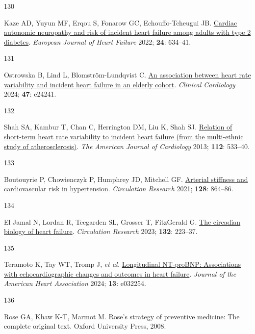 \documentclass[
  a4paper,
  headsepline=true,
  open=left]{scrbook}
\newlength{\cslhangindent}
\newlength{\csllabelwidth}
\newlength{\cslentryspacingunit} %
\newenvironment{CSLReferences}[2] %
 {%
  \setlength{\parindent}{0pt}
  \ifodd #1
  \let\oldpar\par
  \def\par{\hangindent=\cslhangindent\oldpar}
  \fi
  \setlength{\parskip}{#2\cslentryspacingunit}
 }%
 {}
\newcommand{\CSLLeftMargin}[1]{\parbox[t]{\csllabelwidth}{#1}}
\newcommand{\CSLRightInline}[1]{\parbox[t]{\linewidth - \csllabelwidth}{#1}\break}
\begin{document}
\begin{CSLReferences}{0}{0}
\leavevmode{}%
\CSLLeftMargin{130 }%
\CSLRightInline{Kaze AD, Yuyun MF, Erqou S, Fonarow GC,
Echouffo-Tcheugui JB. \href{https://doi.org/10.1002/ejhf.2432}{Cardiac
autonomic neuropathy and risk of incident heart failure among adults
with type 2 diabetes}. \emph{European Journal of Heart Failure} 2022;
\textbf{24}: 634--41.}

\leavevmode{}%
\CSLLeftMargin{131 }%
\CSLRightInline{Ostrowska B, Lind L, Blomström-Lundqvist C.
\href{https://doi.org/10.1002/clc.24241}{An association between heart
rate variability and incident heart failure in an elderly cohort}.
\emph{Clinical Cardiology} 2024; \textbf{47}: e24241.}

\leavevmode{}%
\CSLLeftMargin{132 }%
\CSLRightInline{Shah SA, Kambur T, Chan C, Herrington DM, Liu K, Shah
SJ. \href{https://doi.org/10.1016/j.amjcard.2013.04.018}{Relation of
short-term heart rate variability to incident heart failure (from the
multi-ethnic study of atherosclerosis)}. \emph{The American Journal of
Cardiology} 2013; \textbf{112}: 533--40.}

\leavevmode{}%
\CSLLeftMargin{133 }%
\CSLRightInline{Boutouyrie P, Chowienczyk P, Humphrey JD, Mitchell GF.
\href{https://doi.org/10.1161/CIRCRESAHA.121.318061}{Arterial stiffness
and cardiovascular risk in hypertension}. \emph{Circulation Research}
2021; \textbf{128}: 864--86.}

\leavevmode{}%
\CSLLeftMargin{134 }%
\CSLRightInline{El Jamal N, Lordan R, Teegarden SL, Grosser T,
FitzGerald G. \href{https://doi.org/10.1161/CIRCRESAHA.122.321369}{The
circadian biology of heart failure}. \emph{Circulation Research} 2023;
\textbf{132}: 223--37.}

\leavevmode{}%
\CSLLeftMargin{135 }%
\CSLRightInline{Teramoto K, Tay WT, Tromp J, \emph{et al.}
\href{https://doi.org/10.1161/JAHA.123.032254}{Longitudinal NT{-}proBNP:
Associations with echocardiographic changes and outcomes in heart
failure}. \emph{Journal of the American Heart Association} 2024;
\textbf{13}: e032254.}

\leavevmode{}%
\CSLLeftMargin{136 }%
\CSLRightInline{Rose GA, Khaw K-T, Marmot M. Rose's strategy of
preventive medicine: The complete original text. Oxford University
Press, 2008.}


\end{CSLReferences}
\end{document}
